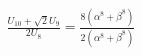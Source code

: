 \documentclass[preview]{standalone}
\begin{document}
\begin{align*}
\frac{U_{10} + \sqrt{2}U_9}{2U_8} = \frac{8(\alpha^8 + \beta^8)}{2(\alpha^8 + \beta^8)}
\end{align*}
\end{document}
